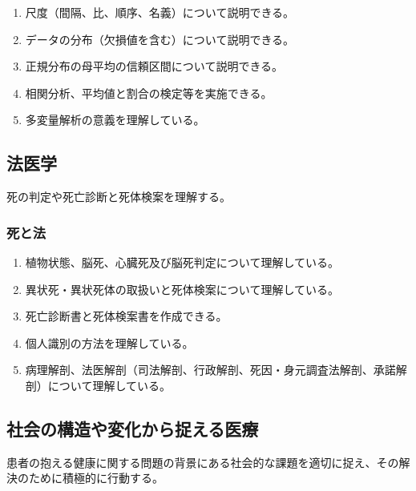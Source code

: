 \begin{enumerate}
\def\labelenumi{\arabic{enumi}.}
\tightlist
\item
  尺度（間隔、比、順序、名義）について説明できる。
\item
  データの分布（欠損値を含む）について説明できる。
\item
  正規分布の母平均の信頼区間について説明できる。
\item
  相関分析、平均値と割合の検定等を実施できる。
\item
  多変量解析の意義を理解している。
\end{enumerate}

\hypertarget{ux6cd5ux533bux5b66}{%
\subsection{法医学}\label{ux6cd5ux533bux5b66}}

死の判定や死亡診断と死体検案を理解する。

\hypertarget{ux6b7bux3068ux6cd5}{%
\subsubsection{死と法}\label{ux6b7bux3068ux6cd5}}

\begin{enumerate}
\def\labelenumi{\arabic{enumi}.}
\tightlist
\item
  植物状態、脳死、心臓死及び脳死判定について理解している。
\item
  異状死・異状死体の取扱いと死体検案について理解している。
\item
  死亡診断書と死体検案書を作成できる。
\item
  個人識別の方法を理解している。
\item
  病理解剖、法医解剖（司法解剖、行政解剖、死因・身元調査法解剖、承諾解剖）について理解している。
\end{enumerate}

\hypertarget{ux793eux4f1aux306eux69cbux9020ux3084ux5909ux5316ux304bux3089ux6349ux3048ux308bux533bux7642}{%
\subsection{社会の構造や変化から捉える医療}\label{ux793eux4f1aux306eux69cbux9020ux3084ux5909ux5316ux304bux3089ux6349ux3048ux308bux533bux7642}}

患者の抱える健康に関する問題の背景にある社会的な課題を適切に捉え、その解決のために積極的に行動する。


